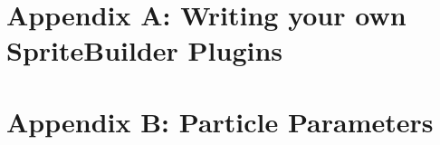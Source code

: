 \documentclass{scrreprt}
\begin{document}
\tableofcontents{}


\newpage

\newpage

\newpage

\newpage

\newpage

\newpage

\newpage

\newpage

\newpage

\newpage


\chapter{Appendix A: Writing your own SpriteBuilder Plugins}
\chapter{Appendix B: Particle Parameters}
\end{document}
